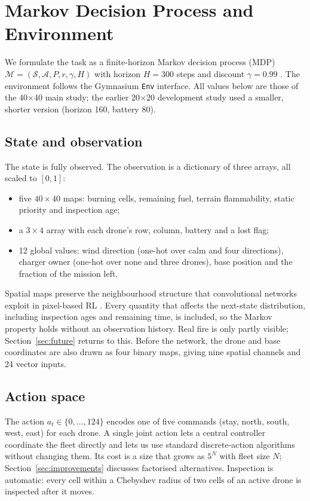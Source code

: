 \section{Markov Decision Process and Environment}

We formulate the task as a finite-horizon Markov decision process (MDP)
$\mathcal{M} = (\mathcal{S}, \mathcal{A}, P, r, \gamma, H)$ with horizon $H = 300$ steps and
discount $\gamma = 0.99$ \cite{sutton2018}. The environment follows the Gymnasium
\texttt{Env} interface. All values below are those of the 40$\times$40 main study; the earlier
20$\times$20 development study used a smaller, shorter version (horizon 160, battery 80).

\subsection{State and observation}

The state is fully observed. The observation is a dictionary of three arrays, all scaled to
$[0,1]$:
\begin{itemize}
\item five $40\times40$ maps: burning cells, remaining fuel, terrain flammability, static
priority and inspection age;
\item a $3\times4$ array with each drone's row, column, battery and a lost flag;
\item 12 global values: wind direction (one-hot over calm and four directions), charger owner
(one-hot over none and three drones), base position and the fraction of the mission left.
\end{itemize}
Spatial maps preserve the neighbourhood structure that convolutional networks exploit in
pixel-based RL \cite{mnih2015}. Every quantity that affects the next-state distribution,
including inspection ages and remaining time, is included, so the Markov property holds
without an observation history. Real fire is only partly visible; Section~\ref{sec:future}
returns to this. Before the network, the drone and base coordinates
are also drawn as four binary maps, giving nine spatial channels and 24 vector inputs.

\subsection{Action space}

The action $a_t \in \{0, \dots, 124\}$ encodes one of five commands (stay, north, south,
west, east) for each drone. A single joint action lets a central controller coordinate the
fleet directly and lets us use standard discrete-action algorithms without changing them.
Its cost is a size that grows as $5^N$ with fleet size $N$; Section~\ref{sec:improvements}
discusses factorised alternatives. Inspection is automatic: every cell within a Chebyshev
radius of two cells of an active drone is inspected after it moves.

